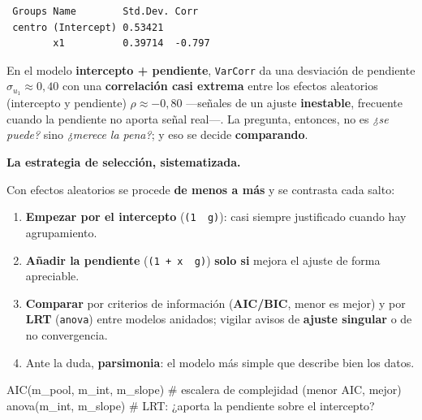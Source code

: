 \documentclass[
  letterpaper,
  DIV=11,
  numbers=noendperiod]{scrartcl}
\newenvironment{Shaded}{\begin{snugshade}}{\end{snugshade}}
\newcommand{\CommentTok}[1]{\textcolor[rgb]{0.37,0.37,0.37}{#1}}
\newcommand{\FunctionTok}[1]{\textcolor[rgb]{0.28,0.35,0.67}{#1}}
\newcommand{\NormalTok}[1]{\textcolor[rgb]{0.00,0.23,0.31}{#1}}
\providecommand{\tightlist}{%
  \setlength{\itemsep}{0pt}\setlength{\parskip}{0pt}}\usepackage{longtable,booktabs,array}
\begin{document}
\begin{verbatim}
 Groups Name        Std.Dev. Corr   
 centro (Intercept) 0.53421         
        x1          0.39714  -0.797 
\end{verbatim}

En el modelo \textbf{intercepto + pendiente}, \texttt{VarCorr} da una
desviación de pendiente \(\hat\sigma_{u_1}\approx0{,}40\) con una
\textbf{correlación casi extrema} entre los efectos aleatorios
(intercepto y pendiente) \(\rho\approx-0{,}80\) ---señales de un ajuste
\textbf{inestable}, frecuente cuando la pendiente no aporta señal
real---. La pregunta, entonces, no es \emph{¿se puede?} sino
\emph{¿merece la pena?}; y eso se decide \textbf{comparando}.

\textbf{La estrategia de selección, sistematizada.}

Con efectos aleatorios se procede \textbf{de menos a más} y se contrasta
cada salto:

\begin{enumerate}
\def\labelenumi{\arabic{enumi}.}
\tightlist
\item
  \textbf{Empezar por el intercepto} (\texttt{(1\ \textbar{}\ g)}): casi
  siempre justificado cuando hay agrupamiento.
\item
  \textbf{Añadir la pendiente} (\texttt{(1\ +\ x\ \textbar{}\ g)})
  \textbf{solo si} mejora el ajuste de forma apreciable.
\item
  \textbf{Comparar} por criterios de información (\textbf{AIC/BIC},
  menor es mejor) y por \textbf{LRT} (\texttt{anova}) entre modelos
  anidados; vigilar avisos de \textbf{ajuste singular} o de no
  convergencia.
\item
  Ante la duda, \textbf{parsimonia}: el modelo más simple que describe
  bien los datos.
\end{enumerate}

\begin{tcolorbox}[enhanced jigsaw, coltitle=black, rightrule=.15mm, arc=.35mm, leftrule=.75mm, colback=white, colbacktitle=quarto-callout-tip-color!10!white, left=2mm, breakable, toptitle=1mm, toprule=.15mm, bottomtitle=1mm, titlerule=0mm, title=\textcolor{quarto-callout-tip-color}{\faLightbulb}\hspace{0.5em}{🔧 En R. Comparar y elegir}, bottomrule=.15mm, opacityback=0, opacitybacktitle=0.6, colframe=quarto-callout-tip-color-frame]

\begin{Shaded}
\begin{Highlighting}[]
\FunctionTok{AIC}\NormalTok{(m\_pool, m\_int, m\_slope)   }\CommentTok{\# escalera de complejidad (menor AIC, mejor)}
\FunctionTok{anova}\NormalTok{(m\_int, m\_slope)          }\CommentTok{\# LRT: ¿aporta la pendiente sobre el intercepto?}
\end{Highlighting}
\end{Shaded}

\end{tcolorbox}
\end{document}
